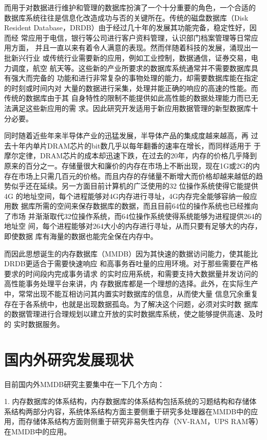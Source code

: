 \documentclass[proposal]{zjutreport}
\begin{document}
而用于对数据进行维护和管理的数据库扮演了一个十分重要的角色，一个合适的
数据库系统往往是信息化改造成功与否的关键所在。传统的磁盘数据库（Disk
Resident Database，DRDB）由于经过几十年的发展其功能完备，稳定性好，因而经
常应用于电信，银行等公司进行客户资料管理，认识部门档案管理等日常应用方面，
并且一直以来有着令人满意的表现。然而伴随着科技的发展，涌现出一批新兴行业
或传统行业需要新的应用，例如工业控制，数据通信，证券交易，电力调度，航空
航天等。这些新的产业所要求的数据库系统通常并不需要数据库具有强大而完备的
功能和进行非常复杂的事物处理的能力，却需要数据库能在指定的时刻或时间内对
大量的数据进行采集，处理并能正确的响应的高速的性能。而传统的数据库由于其
自身特性的限制不能提供如此高性能的数据处理能力而已无法满足这些新应用的需
求。因此研究开发适用于新应用数据管理的新型数据库十分必要。

同时随着近些年来半导体产业的迅猛发展，半导体产品的集成度越来越高，再
过去十年内单片DRAM芯片的bit数几乎以每年翻番的速率在增长，而同样适用于
于摩尔定律，DRAM芯片的成本却迅速下跌，在过去的20年，内存的价格几乎降到
原来的百分之一。存储量很大和廉价的内存在市场上不断出现，现在1G或2G的内
存在市场上只需几百元的价格。而且内存的存储量不断增大而价格却越来越低的趋
势似乎还在延续。另一方面目前计算机的广泛使用的32 位操作系统使得它能提供4G
的地址空间，每个进程能够对4G内存进行寻址，4G内存完全能够容纳一般应用数
据库所需的空间来保存数据库的数据，而且目前64位的操作系统也已经推向了市场
并渐渐取代32位操作系统，而64位操作系统使得系统能够为进程提供264的地址空
间，每个进程能够对264大小的内存进行寻址，从而只要有足够大的内存，即使数据
库有海量的数据也能完全保在内存中。

而因此思想诞生的内存数据库（MMDB）因为其快速的数据访问能力，使其能比DRDB更适合于需要快速响应
和高事务吞吐量的应用环境。对于那些需要在严格要求的时间段内完成事务请求
的实时应用系统，和需要支持大数据量并发访问的高性能事务处理平台来讲，内
存数据库都是一个理想的选择。此外，在实际生产中，常常出现不能互相访问其内置实时数据库的信息，从而使大量
信息冗余重复存在于各系统中，也就是出现数据孤岛。为了解决这个问题，必须对实时数
据库的数据管理进行合理规划以建立开放的实时数据库系统，使之能够提供高速、及时的
实时数据服务。

\section{国内外研究发展现状}
目前国内外MMDB研究主要集中在一下几个方向：

1. 内存数据库的体系结构，内存数据库的体系结构包括系统的习题结构和存储体系结构两部分内容，系统体系结构方面主要侧重于研究多处理器在MMDB中的应用，而存储体系结构方面则侧重于研究非易失性内存（NV-RAM，UPS RAM等）在MMDB中的应用。
\end{document}
